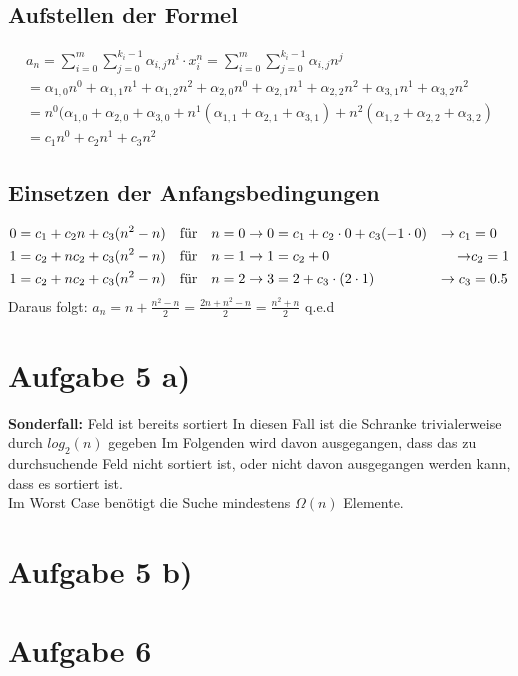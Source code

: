 \documentclass[a4paper,10pt,freqn]{article}
\begin{document}
\subsection{Aufstellen der Formel}
\begin{eqnarray*}
 a_n = \sum_{i=0}^m\sum_{j=0}^{k_i-1} \alpha_{i,j}n^i
 \cdot x_i^n  =\sum_{i=0}^m\sum_{j=0}^{k_i-1} \alpha_{i,j}n^j\\
 =\alpha_{1,0}n^0+\alpha_{1,1}n^1+\alpha_{1,2}n^2+\alpha_{2,0}n^0+\alpha_{2,1}n^1+\alpha_{2,2}n^2+\alpha_{3,1}n^1+\alpha_{3,2}n^2\\=
 n^0(\alpha_{1,0}+\alpha_{2,0}+\alpha_{3,0}+n^1(\alpha_{1,1}+\alpha_{2,1}+\alpha_{3,1})+n^2(\alpha_{1,2}+\alpha_{2,2}+\alpha_{3,2})\\=
 c_1n^0+c_2n^1+c_3n^2
\end{eqnarray*}

\subsection{Einsetzen der Anfangsbedingungen}
\begin{align*}
 0&=c_1+c_2n+c_3(n^2-n) &\text{für\quad}& n = 0\rightarrow 0 = c_1+c_2\cdot0+c_3(-1\cdot0) &\rightarrow c_1& = 0\\
 1&=c_2+nc_2+c_3(n^2-n) &\text{für\quad}& n = 1\rightarrow 1 = c_2+0 &\rightarrow& c_2 = 1\\
 1&=c_2+nc_2+c_3(n^2-n) &\text{für\quad}& n = 2\rightarrow 3 = 2+c_3\cdot(2\cdot1) &\rightarrow c_3& = 0.5\\
\end{align*}
Daraus folgt: $a_n = n+\frac{n^2-n}{2}=\frac{2n+n^2-n}{2}=\frac{n^2+n}{2}$ q.e.d

\section{Aufgabe 5 a)}
\textbf{Sonderfall:} Feld ist bereits sortiert \textrightarrow In diesen Fall ist die Schranke trivialerweise durch $log_2(n)$ gegeben
\newline
Im Folgenden wird davon ausgegangen, dass das zu durchsuchende Feld nicht sortiert ist, oder nicht davon ausgegangen werden kann, dass es sortiert ist.\\
Im Worst Case benötigt die Suche mindestens $\Omega(n)$ Elemente.

\section{Aufgabe 5 b)}

\section{Aufgabe 6}
\end{document}
